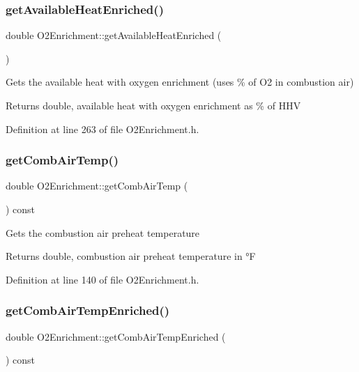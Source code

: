 \subsubsection{\texorpdfstring{get\+Available\+Heat\+Enriched()}{getAvailableHeatEnriched()}}
{\footnotesize\ttfamily double O2\+Enrichment\+::get\+Available\+Heat\+Enriched (\begin{DoxyParamCaption}{ }\end{DoxyParamCaption})\hspace{0.3cm}{\ttfamily [inline]}}

Gets the available heat with oxygen enrichment (uses \% of O2 in combustion air) \begin{DoxyReturn}{Returns}
double, available heat with oxygen enrichment as \% of H\+HV 
\end{DoxyReturn}


Definition at line 263 of file O2\+Enrichment.\+h.

\mbox{\label{class_o2_enrichment_ad3e6bab8c49a1ae5232330fc0e1a537a}} 
\subsubsection{\texorpdfstring{get\+Comb\+Air\+Temp()}{getCombAirTemp()}}
{\footnotesize\ttfamily double O2\+Enrichment\+::get\+Comb\+Air\+Temp (\begin{DoxyParamCaption}{ }\end{DoxyParamCaption}) const\hspace{0.3cm}{\ttfamily [inline]}}

Gets the combustion air preheat temperature \begin{DoxyReturn}{Returns}
double, combustion air preheat temperature in °F 
\end{DoxyReturn}


Definition at line 140 of file O2\+Enrichment.\+h.

\mbox{\label{class_o2_enrichment_ad628ffe961a2733c60e5008fd044eabe}} 
\subsubsection{\texorpdfstring{get\+Comb\+Air\+Temp\+Enriched()}{getCombAirTempEnriched()}}
{\footnotesize\ttfamily double O2\+Enrichment\+::get\+Comb\+Air\+Temp\+Enriched (\begin{DoxyParamCaption}{ }\end{DoxyParamCaption}) const\hspace{0.3cm}{\ttfamily [inline]}}

